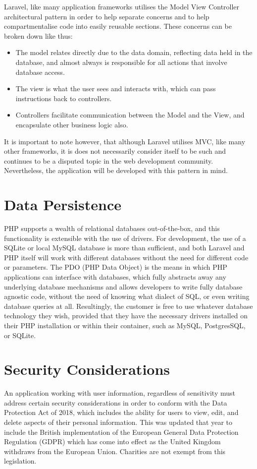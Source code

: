 Laravel, like many application frameworks utilises the Model View Controller architectural pattern in order to help separate concerns and to help compartmentalise code into easily reusable sections. \cite{Ighodaro1} These concerns can be broken down like thus:

\begin{itemize}
    \item The model relates directly due to the data domain, reflecting data held in the database, and almost always is responsible for all actions that involve database access.
    \item The view is what the user sees and interacts with, which can pass instructions back to controllers.
    \item Controllers facilitate communication between the Model and the View, and encapsulate other business logic also. \cite{7892651}
\end{itemize}

It is important to note however, that although Laravel utilises MVC, like many other frameworks, it is does not necessarily consider itself to be such and continues to be a disputed topic in the web development community. \cite{Otwell1} Nevertheless, the application will be developed with this pattern in mind.

\section{Data Persistence}

PHP supports a wealth of relational databases out-of-the-box, and this functionality is extensible with the use of drivers. For development, the use of a SQLite or local MySQL database is more than sufficient, and both Laravel and PHP itself will work with different databases without the need for different code or parameters. The PDO (PHP Data Object) is the means in which PHP applications can interface with databases, which fully abstracts away any underlying database mechanisms and allows developers to write fully database agnostic code, without the need of knowing what dialect of SQL, or even writing database queries at all. Resultingly, the customer is free to use whatever database technology they wish, provided that they have the necessary drivers installed on their PHP installation or within their container, such as MySQL, PostgresSQL, or SQLite. \cite{PHP1}

\section{Security Considerations}
An application working with user information, regardless of sensitivity must address certain security considerations in order to conform with the Data Protection Act of 2018, which includes the ability for users to view, edit, and delete aspects of their personal information. This was updated that year to include the British implementation of the European General Data Protection Regulation (GDPR) which has come into effect as the United Kingdom withdraws from the European Union. Charities are not exempt from this legislation. \cite{HMGovt1} \cite{HMGovt2}

